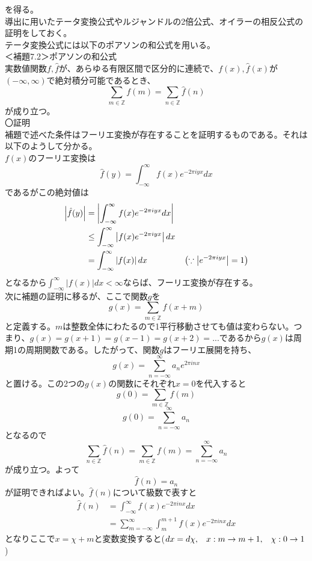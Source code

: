 \documentclass{jsarticle}
\begin{document}
を得る。\\
導出に用いたテータ変換公式やルジャンドルの2倍公式、オイラーの相反公式の証明をしておく。\\
テータ変換公式には以下のポアソンの和公式を用いる。\\
＜補題7.2＞ポアソンの和公式\\
実数値関数\(f,\hat{f}\)が、あらゆる有限区間で区分的に連続で、\(f(x),\hat{f}(x)\)が\((-\infty,\infty)\)で絶対積分可能であるとき、
\begin{equation}
\sum_{m\in\mathbb{Z}}f(m)=\sum_{n\in\mathbb{Z}}\hat{f}(n)
\end{equation}
が成り立つ。\\
〇証明\\
補題で述べた条件はフーリエ変換が存在することを証明するものである。それは以下のようして分かる。\\
\(f(x)\)のフーリエ変換は
\[\hat{f}(y)=\int_{-\infty}^{\infty}f(x)e^{-2\pi iyx}dx\]
であるがこの絶対値は
\begin{align*}
\left|\hat{f}(y)\right|&=\left|\int_{-\infty}^{\infty}f(x)e^{-2\pi iyx}dx\right|\\
&\leq\int_{-\infty}^{\infty}\left|f(x)e^{-2\pi iyx}\right|dx\\
&=\int_{-\infty}^{\infty}\left|f(x)\right|dx\hspace{15mm}\left(\because \left|e^{-2\pi iyx}\right|=1\right)
\end{align*}
となるから\(\displaystyle\int_{-\infty}^{\infty}\left|f(x)\right|dx<\infty\)ならば、フーリエ変換が存在する。\\
次に補題の証明に移るが、ここで関数\(g\)を
\[g(x)=\sum_{m\in\mathbb{Z}}f(x+m)\]
と定義する。\(m\)は整数全体にわたるので1平行移動させても値は変わらない。つまり、\(g(x)=g(x+1)=g(x-1)=g(x+2)=...\)であるから\(g(x)\)は周期1の周期関数である。したがって、関数\(g\)はフーリエ展開を持ち、
\[g(x)=\sum_{n=-\infty}^{\infty}a_{n}e^{2\pi inx}\]
と置ける。この2つの\(g(x)\)の関数にそれぞれ\(x=0\)を代入すると
\[g(0)=\sum_{m\in\mathbb{Z}}f(m)\]
\[g(0)=\sum_{n=-\infty}^{\infty}a_{n}\]
となるので
\[\sum_{n\in\mathbb{Z}}\hat{f}(n)=\sum_{m\in\mathbb{Z}}f(m)=\sum_{n=-\infty}^{\infty}a_{n}\]
が成り立つ。よって
\[\hat{f}(n)=a_{n}\]
が証明できればよい。\(\hat{f}(n)\)について級数で表すと
\begin{align*}
\hat{f}(n)&=\int_{-\infty}^{\infty}f(x)e^{-2\pi inx}dx\\
&=\sum_{m=-\infty}^{\infty}\int_{m}^{m+1}f(x)e^{-2\pi inx}dx
\end{align*}
となりここで\(x=\chi+m\)と変数変換すると(\(dx=d\chi,\hspace{3mm}x:m\to m+1,\hspace{3mm}\chi:0\to1\))
\end{document}
